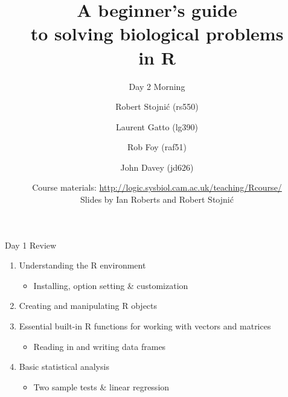 \documentclass{beamer}
\title[Cambridge R Course]{A beginner's guide\\to solving biological problems\\in R}
\subtitle{Day 2 Morning\\}
\author[]{Robert Stojni\'{c} (rs550) \and Laurent Gatto (lg390) \and Rob Foy (raf51) \and John Davey (jd626)}
\date[]{Course materials: \url{http://logic.sysbiol.cam.ac.uk/teaching/Rcourse/}\\Slides by Ian Roberts and Robert Stojni\'{c}}
\begin{document}
\begin{frame}
    \titlepage
\end{frame}

\begin{frame}{Day 1 Review}
\begin{enumerate}
    \item Understanding the R environment
    \begin{itemize}
        \item Installing, option setting \& customization
    \end{itemize}
    \item Creating and manipulating R objects
    \item Essential built-in R functions for working with vectors and matrices
    \begin{itemize}
        \item Reading in and writing data frames
    \end{itemize}
    \item Basic statistical analysis
    \begin{itemize}
        \item Two sample tests \& linear regression
    \end{itemize}
\end{enumerate}
\end{frame}
\end{document}
